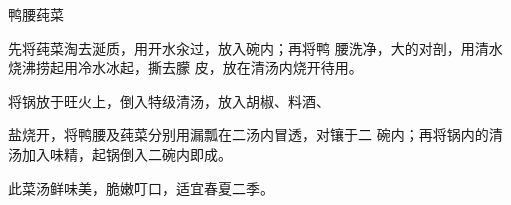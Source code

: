 \begin{recipe}{鸭腰莼菜}

\ingredients


\cooking

\step 	先将莼菜淘去涎质，用开水汆过，放入碗内；再将鸭 腰洗净，大的对剖，用清水烧沸捞起用冷水冰起，撕去朦 皮，放在清汤内烧开待用。

\step 	将锅放于旺火上，倒入特级清汤，放入胡椒、料酒、

盐烧开，将鸭腰及莼菜分别用漏瓢在二汤内冒透，对镶于二 碗内；再将锅内的清汤加入味精，起锅倒入二碗内即成。

\notes

此菜汤鲜味美，脆嫩叮口，适宜春夏二季。

\end{recipe}

